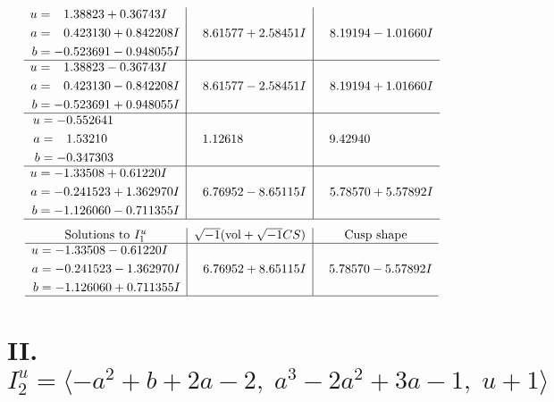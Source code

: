 \documentclass[1p]{elsarticle_modified}
\theoremstyle{definition}
\newcommand{\I}{\sqrt{-1}}
\begin{document}
$$\begin{array}{c|c|c}
\begin{aligned}
u &= \phantom{-}1.38823 + 0.36743 I \\
a &= \phantom{-}0.423130 + 0.842208 I \\
b &= -0.523691 - 0.948055 I\end{aligned}
 & \phantom{-}8.61577 + 2.58451 I & \phantom{-}8.19194 - 1.01660 I \\ \hline\begin{aligned}
u &= \phantom{-}1.38823 - 0.36743 I \\
a &= \phantom{-}0.423130 - 0.842208 I \\
b &= -0.523691 + 0.948055 I\end{aligned}
 & \phantom{-}8.61577 - 2.58451 I & \phantom{-}8.19194 + 1.01660 I \\ \hline\begin{aligned}
u &= -0.552641\phantom{ +0.000000I} \\
a &= \phantom{-}1.53210\phantom{ +0.000000I} \\
b &= -0.347303\phantom{ +0.000000I}\end{aligned}
 & \phantom{-}1.12618\phantom{ +0.000000I} & \phantom{-}9.42940\phantom{ +0.000000I} \\ \hline\begin{aligned}
u &= -1.33508 + 0.61220 I \\
a &= -0.241523 + 1.362970 I \\
b &= -1.126060 - 0.711355 I\end{aligned}
 & \phantom{-}6.76952 - 8.65115 I & \phantom{-}5.78570 + 5.57892 I\\
 \hline 
 \end{array}$$\newpage$$\begin{array}{c|c|c}  
\text{Solutions to }I^u_{1}& \I (\text{vol} + \sqrt{-1}CS) & \text{Cusp shape}\\
 \hline 
\begin{aligned}
u &= -1.33508 - 0.61220 I \\
a &= -0.241523 - 1.362970 I \\
b &= -1.126060 + 0.711355 I\end{aligned}
 & \phantom{-}6.76952 + 8.65115 I & \phantom{-}5.78570 - 5.57892 I\\
 \hline 
 \end{array}$$\newpage\newpage\renewcommand{\arraystretch}{1}
\centering \section*{II. $I^u_{2}= \langle - a^2+b+2 a-2,\;a^3-2 a^2+3 a-1,\;u+1 \rangle$}
\end{document}
